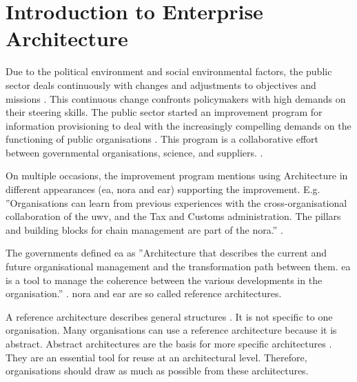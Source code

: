 \section{Introduction to Enterprise Architecture}
\label{sec:introea}
Due to the political environment and social environmental factors, the public sector deals continuously with changes and adjustments to objectives and missions \parencite{EARbaten}. This continuous change confronts policymakers with high demands on their steering skills. The public sector started an improvement program for information provisioning \parencite{Digitaleoverheid2021} to deal with the increasingly compelling demands on the functioning of public organisations \parencite[p.~13]{Eck2009}. This program is a collaborative effort between governmental organisations, science, and suppliers. \parencite[p.~128]{Digitaleoverheid2021}.

On multiple occasions, the improvement program mentions using Architecture in different appearances (\acrlong{ea}, \acrfull{nora} and \acrfull{ear}) supporting the improvement. E.g. ''Organisations can learn from previous experiences with the cross-organisational collaboration of the \acrlong{uwv}, and the Tax and Customs administration. The pillars and building blocks for chain management are part of the \acrshort{nora}.'' \parencite[p.~40]{Digitaleoverheid2021}. 

The governments defined \acrlong{ea} as ''Architecture that describes the current and future organisational management and the transformation path between them. \acrlong{ea} is a tool to manage the coherence between the various developments in the organisation.'' \parencite{NoraEA}. \acrshort{nora} and \acrshort{ear} are so called reference architectures.

A reference architecture describes general structures \parencite[p.~8]{Greefhorst2008}. It is not specific to one organisation. Many organisations can use a reference architecture because it is abstract. Abstract architectures are the basis for more specific architectures \parencite[p.~11]{Greefhorst2008}. They are an essential tool for reuse at an architectural level. Therefore, organisations should draw as much as possible from these architectures.

